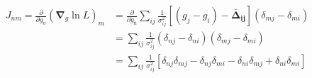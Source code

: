 \begin{align}
  J_{nm} = \frac{\partial}{\partial g_n} \left( \boldsymbol \nabla _{g}
  \ln L \right)_m &= \frac{\partial}{\partial g_n} \sum_{ij}
  \frac{1}{\sigma^2_{ij}} \left[ (g_j - g_i ) -
    \boldsymbol{\bar{\Delta}_{ij}}\right](\delta_{mj} - \delta_{mi})
  \\ 
  &= \sum_{ij} \frac{1}{\sigma^2_{ij}} ( \delta_{nj} - \delta_{ni}
  )(\delta_{mj} - \delta_{mi}) \\
  &= \sum_{ij} \frac{1}{\sigma^2_{ij}} \left[ \delta_{nj} \delta_{mj}
    - \delta_{nj}\delta_{mi} - \delta_{ni}\delta_{mj} + \delta_{ni}
    \delta_{mi} \right] \\
\end{align}
